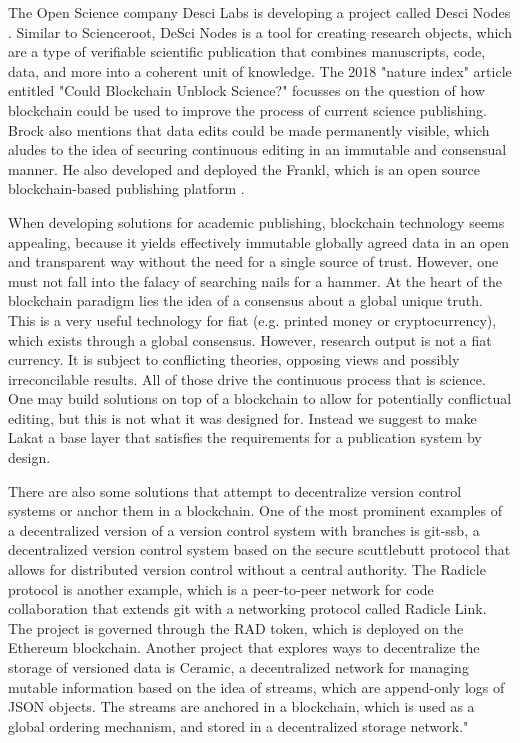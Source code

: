 The Open Science company Desci Labs is developing a project called Desci Nodes \cite{descilabs}. Similar to Scienceroot, DeSci Nodes is a tool for creating research objects, which are a type of verifiable scientific publication that combines manuscripts, code, data, and more into a coherent unit of knowledge.  
The 2018 "nature index" article \cite{brock2018} entitled "Could Blockchain Unblock Science?" focusses on the question of how blockchain could be used to improve the process of current science publishing. Brock also mentions that data edits could be made permanently visible, which aludes to the idea of securing continuous editing in an immutable and consensual manner. He also developed and deployed the Frankl, which is an open source blockchain-based publishing platform \cite{brockOpenScience2018}. 

When developing solutions for academic publishing, blockchain technology seems appealing, because it yields effectively immutable globally agreed data in an open and transparent way without the need for a single source of trust. However, one must not fall into the falacy of searching nails for a hammer. At the heart of the blockchain paradigm lies the idea of a consensus about a global unique truth. This is a very useful technology for fiat (e.g. printed money or cryptocurrency), which exists through a global consensus. However, research output is not a fiat currency. It is subject to conflicting theories, opposing views and possibly irreconcilable results. All of those drive the continuous process that is science. One may build solutions on top of a blockchain to allow for potentially conflictual editing, but this is not what it was designed for. Instead we suggest to make Lakat a base layer that satisfies the requirements for a publication system by design.
   
There are also some solutions that attempt to decentralize version control systems or anchor them in a blockchain. One of the most prominent examples of a decentralized version of a version control system with branches is git-ssb, a decentralized version control system based on the secure scuttlebutt protocol that allows for distributed version control without a central authority\cite{gitssb}. The Radicle protocol is another example, which is a peer-to-peer network for code collaboration that extends git with a networking protocol called Radicle Link\cite{radicle}. The project is governed through the RAD token, which is deployed on the Ethereum blockchain. Another project that explores ways to decentralize the storage of versioned data is Ceramic, a decentralized network for managing mutable information based on the idea of streams, which are append-only logs of JSON objects. The streams are anchored in a blockchain, which is used as a global ordering mechanism, and stored in a decentralized storage network\cite{ceramic}."

